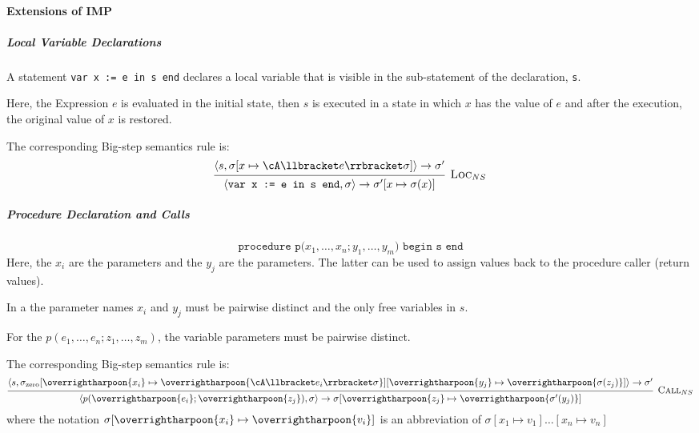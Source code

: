 \newpage
\paragraph{Extensions of IMP}
\subparagraph{Local Variable Declarations}
\label{sec:big-step-local-var}
A statement \texttt{var x := e in s end} declares a local variable that is visible in the sub-statement of the declaration, \texttt{s}.

Here, the Expression $e$ is evaluated in the initial state, then $s$ is executed in a state in which $x$ has the value of $e$ and after the execution,
the original value of $x$ is restored.

The corresponding Big-step semantics rule is:
\[
    \begin{prooftree}
        \hypo{\langle s, \sigma[x \mapsto \cA \llbracket e \rrbracket \sigma] \rangle \rightarrow \sigma' }
        \infer1[\textsc{Loc}$_{NS}$]{\langle \texttt{var x := e in s end}, \sigma \rangle \rightarrow \sigma'[x \mapsto \sigma(x)]}
    \end{prooftree}
\]


\subparagraph{Procedure Declaration and Calls}
\[
    \texttt{procedure p(}x_1, \ldots, x_n; y_1, \ldots, y_m \texttt{) begin s end}
\]
Here, the $x_i$ are the  parameters and the $y_j$ are the  parameters. The latter can be used to assign values back to the procedure caller (return values).

In a  the  parameter names $x_i$ and $y_j$ must be pairwise distinct and the only free variables in $s$.

For the  $p(e_1, \ldots, e_n; z_1, \ldots, z_m)$, the  variable parameters must be pairwise distinct.

The corresponding Big-step semantics rule is:
\[
    \begin{prooftree}
        \hypo{\langle s, \sigma_\text{zero}[\overrightharpoon{x_i} \mapsto \overrightharpoon{\cA \llbracket e_i \rrbracket \sigma}]
            [\overrightharpoon{y_j} \mapsto \overrightharpoon{\sigma(z_j)}] \rangle \rightarrow \sigma'}
        \infer1[\textsc{Call}$_{NS}$]{\langle p(\overrightharpoon{e_i}; \overrightharpoon{z_j}), \sigma \rangle
            \rightarrow \sigma[\overrightharpoon{z_j} \mapsto \overrightharpoon{\sigma'(y_j)}]}
    \end{prooftree}
\]
where the notation $\sigma[\overrightharpoon{x_i} \mapsto \overrightharpoon{v_i}]$ is an abbreviation of $\sigma[x_1 \mapsto v_1]\ldots[x_n \mapsto v_n]$


